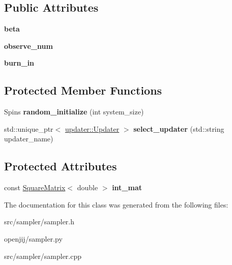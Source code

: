 \subsection*{Public Attributes}
\begin{DoxyCompactItemize}
\item 
\mbox{\label{structopenjij_1_1sampler_1_1_sampler_a583739528a6f6a526427456820ac96eb}} 
{\bfseries beta}
\item 
\mbox{\label{structopenjij_1_1sampler_1_1_sampler_ad64a395d749c3fd16c2f8719ed39deeb}} 
{\bfseries observe\+\_\+num}
\item 
\mbox{\label{structopenjij_1_1sampler_1_1_sampler_a7debc64f0e4a1f1d12a654f36cc750d5}} 
{\bfseries burn\+\_\+in}
\end{DoxyCompactItemize}
\subsection*{Protected Member Functions}
\begin{DoxyCompactItemize}
\item 
\mbox{\label{structopenjij_1_1sampler_1_1_sampler_a9606e589274c85e82d3be488bc463f28}} 
Spins {\bfseries random\+\_\+initialize} (int system\+\_\+size)
\item 
\mbox{\label{structopenjij_1_1sampler_1_1_sampler_a4bcf0ba900808ac093a3c576a624730a}} 
std\+::unique\+\_\+ptr$<$ \mbox{\hyperlink{structopenjij_1_1updater_1_1_updater}{updater\+::\+Updater}} $>$ {\bfseries select\+\_\+updater} (std\+::string updater\+\_\+name)
\end{DoxyCompactItemize}
\subsection*{Protected Attributes}
\begin{DoxyCompactItemize}
\item 
\mbox{\label{structopenjij_1_1sampler_1_1_sampler_aa247d557db390e993a8603956c589ed3}} 
const \mbox{\hyperlink{structopenjij_1_1_square_matrix}{Square\+Matrix}}$<$ double $>$ {\bfseries int\+\_\+mat}
\end{DoxyCompactItemize}


The documentation for this class was generated from the following files\+:\begin{DoxyCompactItemize}
\item 
src/sampler/sampler.\+h\item 
openjij/sampler.\+py\item 
src/sampler/sampler.\+cpp\end{DoxyCompactItemize}
